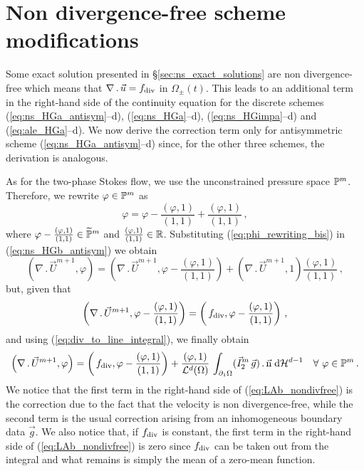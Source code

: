 \section{Non divergence-free scheme modifications}\label{sec:ns_non_div_free}
Some exact solution presented in \S\ref{sec:ns_exact_solutions} are non
divergence-free which means that $\nabla\,.\,\vec u = f_{\rm{div}}$ in
$\Omega_\pm(t)$. This leads to an additional term in the right-hand side of the
continuity equation for the discrete schemes (\ref{eq:ns_HGa_antisym}--d),
(\ref{eq:ns_HGa}--d), (\ref{eq:ns_HGimpa}--d) and (\ref{eq:ale_HGa}--d). We
now derive the correction term only for antisymmetric scheme
(\ref{eq:ns_HGa_antisym}--d) since, for the other three schemes, the
derivation is analogous.

As for the two-phase Stokes flow, we use the unconstrained pressure space
$\mathbb{P}^m$. Therefore, we rewrite $\varphi\in \mathbb{P}^m$ as
\begin{equation}\label{eq:phi_rewriting_bis}
\varphi=\varphi-\frac{\left(\varphi,1\right)}{\left(1,1\right)}
+\frac{\left(\varphi,1\right)}{\left(1,1\right)}\,,
\end{equation}
where $\varphi-\frac{(\varphi,1)}{(1,1)}\in\widetilde{\mathbb{P}}^m$ and
$\frac{(\varphi,1)}{(1,1)}\in\mathbb R$. Substituting (\ref{eq:phi_rewriting_bis}) in
(\ref{eq:ns_HGb_antisym}) we obtain
\begin{equation}
\left(\nabla\,.\,\vec U^{m+1}, \varphi\right)  =
\left(\nabla\,.\,\vec U^{m+1},
\varphi-\frac{\left(\varphi,1\right)}{\left(1,1\right)}\right) +
\left(\nabla\,.\,\vec U^{m+1},1\right)
\frac{\left(\varphi,1\right)}{\left(1,1\right)}\,,
\end{equation}
but, given that
\begin{equation}
\left(\nabla\,.\,\vec U^{m+1},
\varphi-\frac{\left(\varphi,1\right)}{\left(1,1\right)}\right) =
\left(\,f_{\rm{div}},
\varphi-\frac{\left(\varphi,1\right)}{\left(1,1\right)}\right)\,,
\end{equation}
and using (\ref{eq:div_to_line_integral}), we finally obtain
\begin{equation}\label{eq:LAb_nondivfree}
\left(\nabla\,.\,\vec U^{m+1}, \varphi\right) =
\left(\,f_{\rm{div}},
\varphi-\frac{\left(\varphi,1\right)}{\left(1,1\right)}\right)+
\frac{\left(\varphi, 1\right)}{\mathcal{L}^d(\Omega)}\, \int_{\partial_1\Omega}
(\vec I^m_2\,\vec g) \,.\, \vec{\rm n} \;{\rm d}{\cal H}^{d-1} \quad \forall\ \varphi \in
\mathbb{P}^m\,.
\end{equation}
We notice that the first term in the right-hand side of
(\ref{eq:LAb_nondivfree}) is the correction due to the fact that the velocity is
non divergence-free, while the second term is the usual correction arising
from an inhomogeneous boundary data $\vec g$. We also notice that, if
$f_{\rm{div}}$ is constant, the first term in the right-hand side of
(\ref{eq:LAb_nondivfree}) is zero since $f_{\rm{div}}$ can be taken out
from the integral and what remains is simply the mean of a zero-mean function.

